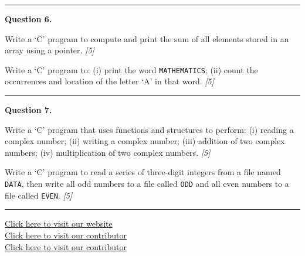 \documentclass[11pt,a4paper]{article}
\newcommand{\pts}[1]{\hfill   \textit{[#1]}}
\begin{document}
\medskip\rule{\linewidth}{0.2pt}

\medskip


\noindent   \textbf{Question 6.}

\begin{parts}
  \item Write a `C' program to compute and print the sum of all elements stored in an array using a pointer. \pts{5}
  \item Write a `C' program to: (i) print the word   \texttt{MATHEMATICS}; (ii) count the occurrences and location of the letter `A' in that word. \pts{5}
\end{parts}

\medskip\rule{\linewidth}{0.2pt}

\medskip


\noindent   \textbf{Question 7.}

\begin{parts}
  \item Write a `C' program that uses functions and structures to perform: (i) reading a complex number; (ii) writing a complex number; (iii) addition of two complex numbers; (iv) multiplication of two complex numbers. \pts{5}
  \item Write a `C' program to read a series of three-digit integers from a file named   \texttt{DATA}, then write all odd numbers to a file called   \texttt{ODD} and all even numbers to a file called   \texttt{EVEN}. \pts{5}
\end{parts}

\vfill\rule{\linewidth}{0.4pt}

\begin{center}\small
  \href{https://bhu-exam.vercel.app/}{Click here to visit our website}\\[4pt]
  \href{https://me-aryan.vercel.app/}{Click here to visit our contributor}\\[4pt]
  \href{https://quashan-me.vercel.app/}{Click here to visit our contributor}
\end{center}
\end{document}

